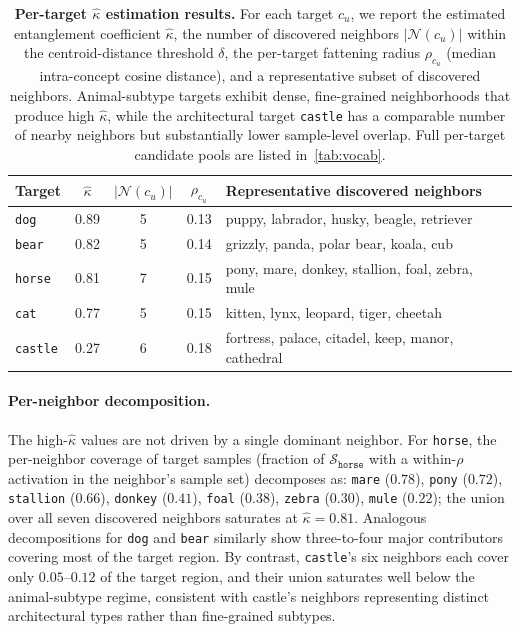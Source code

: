 \begin{table}[h]
\centering
\small
\setlength{\tabcolsep}{6pt}
\begin{tabular}{lcccl}
\toprule
\textbf{Target} & $\hat\kappa$ & $|\mathcal{N}(c_u)|$ & $\rho_{c_u}$ & \textbf{Representative discovered neighbors} \\
\midrule
\texttt{dog}    & 0.89 & 5 & 0.13 & puppy, labrador, husky, beagle, retriever \\
\texttt{bear}   & 0.82 & 5 & 0.14 & grizzly, panda, polar bear, koala, cub \\
\texttt{horse}  & 0.81 & 7 & 0.15 & pony, mare, donkey, stallion, foal, zebra, mule \\
\texttt{cat}    & 0.77 & 5 & 0.15 & kitten, lynx, leopard, tiger, cheetah \\
\texttt{castle} & 0.27 & 6 & 0.18 & fortress, palace, citadel, keep, manor, cathedral \\
\bottomrule
\end{tabular}
\caption{
\textbf{Per-target $\hat\kappa$ estimation results.} 
For each target $c_u$, we report the estimated entanglement coefficient $\hat\kappa$, the number of discovered neighbors $|\mathcal{N}(c_u)|$ within the centroid-distance threshold $\delta$, the per-target fattening radius $\rho_{c_u}$ (median intra-concept cosine distance), and a representative subset of discovered neighbors. Animal-subtype targets exhibit dense, fine-grained neighborhoods that produce high $\hat\kappa$, while the architectural target \texttt{castle} has a comparable number of nearby neighbors but substantially lower sample-level overlap. Full per-target candidate pools are listed in~\cref{tab:vocab}.
}
\label{tab:kappa_per_target}
\end{table}

\paragraph{Per-neighbor decomposition.}
The high-$\hat\kappa$ values are not driven by a single dominant neighbor. For \texttt{horse}, the per-neighbor coverage of target samples (fraction of $\mathcal{S}_{\texttt{horse}}$ with a within-$\rho$ activation in the neighbor's sample set) decomposes as: \texttt{mare} ($0.78$), \texttt{pony} ($0.72$), \texttt{stallion} ($0.66$), \texttt{donkey} ($0.41$), \texttt{foal} ($0.38$), \texttt{zebra} ($0.30$), \texttt{mule} ($0.22$); the union over all seven discovered neighbors saturates at $\hat\kappa = 0.81$. Analogous decompositions for \texttt{dog} and \texttt{bear} similarly show three-to-four major contributors covering most of the target region. By contrast, \texttt{castle}'s six neighbors each cover only $0.05$--$0.12$ of the target region, and their union saturates well below the animal-subtype regime, consistent with castle's neighbors representing distinct architectural types rather than fine-grained subtypes.

